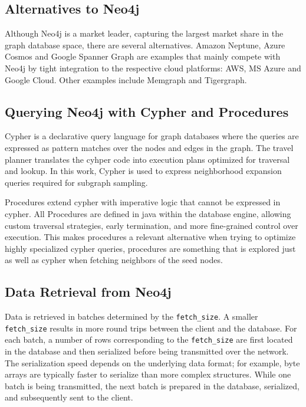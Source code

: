 \documentclass[ oneside,openright,titlepage,numbers=noenddot,headinclude,%
                footinclude=true,cleardoublepage=empty,abstractoff, %
                BCOR=0mm,paper=a4,fontsize=11pt,%
                ngerman,american,%
                ]{scrreprt}
\begin{document}
\subsection{Alternatives to Neo4j}

Although Neo4j is a market leader, capturing the largest market share in the graph database space, there are several alternatives. Amazon Neptune, Azure Cosmos and Google Spanner Graph are examples that mainly compete with Neo4j by tight integration to the respective cloud platforms: AWS, MS Azure and Google Cloud. Other examples include Memgraph and Tigergraph.


\subsection{Querying Neo4j with Cypher and Procedures}

Cypher is a declarative query language for graph databases where the queries are expressed as pattern matches over the nodes and edges in the graph. The travel planner translates the cyhper code into execution plans optimized for traversal and lookup. In this work, Cypher is used to express neighborhood expansion queries required for subgraph sampling.

Procedures extend cypher with imperative logic that cannot be expressed in cypher. All Procedures are defined in java within the database engine, allowing custom traversal strategies, early termination, and more fine-grained control over execution. This makes procedures a relevant alternative when trying to optimize highly specialized cypher queries, procedures are something that is explored just as well as cypher when fetching neighbors of the seed nodes.

\subsection{Data Retrieval from Neo4j
}
Data is retrieved in batches determined by the \texttt{fetch\_size}. A smaller \texttt{fetch\_size} results in more round trips between the client and the database.
For each batch, a number of rows corresponding to the \texttt{fetch\_size} are first located in the database and then serialized before being transmitted over the network. The serialization speed depends on the underlying data format; for example, byte arrays are typically faster to serialize than more complex structures.
While one batch is being transmitted, the next batch is prepared in the database, serialized, and subsequently sent to the client.
\end{document}
